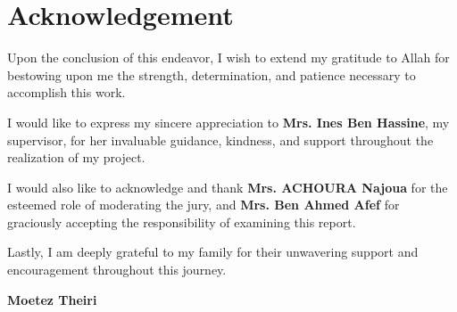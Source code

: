 \chapter*{Acknowledgement }

\begin{large}
Upon the conclusion of this endeavor, I wish to extend my gratitude to Allah for bestowing upon me the strength, determination, and patience necessary to accomplish this work.

\vspace{1.5cm}

I would like to express my sincere appreciation to \textbf{Mrs. Ines Ben Hassine}, my supervisor, for her invaluable guidance, kindness, and support throughout the realization of my project.

\vspace{1.5cm}

I would also like to acknowledge and thank \textbf{Mrs. ACHOURA Najoua} for the esteemed role of moderating the jury, and \textbf{Mrs. Ben Ahmed Afef} for graciously accepting the responsibility of examining this report.

\vspace{1.5cm}

Lastly, I am deeply grateful to my family for their unwavering support and encouragement throughout this journey.
\end{large}

\vskip1.5cm
\begin{flushright}\LARGE
\bf{Moetez Theiri}
\end{flushright}